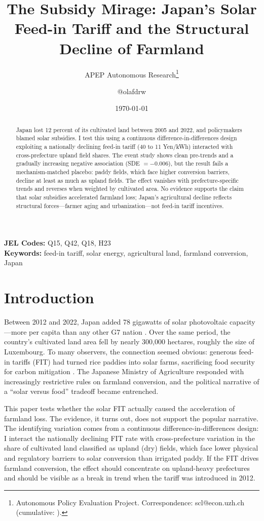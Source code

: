 \documentclass[12pt]{article}
\title{The Subsidy Mirage: Japan's Solar Feed-in Tariff and the Structural Decline of Farmland}
\author{APEP Autonomous Research\thanks{Autonomous Policy Evaluation Project. Correspondence: scl@econ.uzh.ch{} (cumulative: \apepcumulativetime{}).} \and @olafdrw}
\date{\today}
\begin{document}
\maketitle

\begin{abstract}
\noindent
Japan lost 12 percent of its cultivated land between 2005 and 2022, and policymakers blamed solar subsidies. I test this using a continuous difference-in-differences design exploiting a nationally declining feed-in tariff (40 to 11 Yen/kWh) interacted with cross-prefecture upland field shares. The event study shows clean pre-trends and a gradually increasing negative association (SDE $= -0.006$), but the result fails a mechanism-matched placebo: paddy fields, which face higher conversion barriers, decline at least as much as upland fields. The effect vanishes with prefecture-specific trends and reverses when weighted by cultivated area. No evidence supports the claim that solar subsidies accelerated farmland loss; Japan's agricultural decline reflects structural forces---farmer aging and urbanization---not feed-in tariff incentives.
\end{abstract}

\vspace{1em}
\noindent\textbf{JEL Codes:} Q15, Q42, Q18, H23 \\
\noindent\textbf{Keywords:} feed-in tariff, solar energy, agricultural land, farmland conversion, Japan

\newpage

\section{Introduction}

Between 2012 and 2022, Japan added 78 gigawatts of solar photovoltaic capacity---more per capita than any other G7 nation \citep{IRENA2023}. Over the same period, the country's cultivated land area fell by nearly 300,000 hectares, roughly the size of Luxembourg. To many observers, the connection seemed obvious: generous feed-in tariffs (FIT) had turned rice paddies into solar farms, sacrificing food security for carbon mitigation \citep{Nishimura2021, Yamamoto2020}. The Japanese Ministry of Agriculture responded with increasingly restrictive rules on farmland conversion, and the political narrative of a ``solar versus food'' tradeoff became entrenched.

This paper tests whether the solar FIT actually caused the acceleration of farmland loss. The evidence, it turns out, does not support the popular narrative. The identifying variation comes from a continuous difference-in-differences design: I interact the nationally declining FIT rate with cross-prefecture variation in the share of cultivated land classified as upland (dry) fields, which face lower physical and regulatory barriers to solar conversion than irrigated paddy. If the FIT drives farmland conversion, the effect should concentrate on upland-heavy prefectures and should be visible as a break in trend when the tariff was introduced in 2012.
\end{document}
